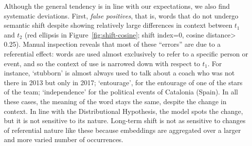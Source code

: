 Although the general tendency is in line with our expectations, we
also find systematic deviations. First, \textit{false positives}, that
is, words that do not undergo semantic shift despite showing
relatively large differences in context between $t_1$ and $t_2$ (red ellipsis in
Figure~\ref{fig:shift-cosine}; shift index=0, cosine distance\textgreater	
0.25). 
Manual inspection reveals that most of these ``errors'' 
are due to a referential effect: words are used
almost exclusively to refer to a specific person or event, and
so the context of use is narrowed down with respect to $t_1$.
For instance, `stubborn' is
almost always used to talk about a coach who was not
there in 2013 but only in 2017; 
`entourage', for the entourage of one of the stars of the team; `independence' for the
political events of Catalonia (Spain). 
In all these cases, the meaning of the word stays the same, despite
the change in context. In line with the Distributional Hypothesis, the model spots the change, but it is not sensitive to its nature.
Long-term shift is not as sensitive to changes of referential nature
like these because
embeddings are aggregated over a larger and more varied number of
occurrences.




